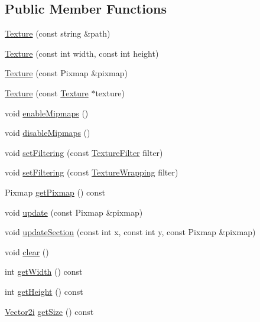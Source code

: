 \subsection*{Public Member Functions}
\begin{DoxyCompactItemize}
\item 
\hyperlink{class_texture_ab80c17c96759a05e3b3931c3ba2b4179}{Texture} (const string \&path)
\item 
\hyperlink{class_texture_a030e857c4f7c343ec37daa7f2cbab8ac}{Texture} (const int width, const int height)
\item 
\hyperlink{class_texture_ac7b9dca5c1353a30373c07c465e91390}{Texture} (const Pixmap \&pixmap)
\item 
\hyperlink{class_texture_a7a44f80c7050182de12601b457ecbe14}{Texture} (const \hyperlink{class_texture}{Texture} $\ast$texture)
\item 
void \hyperlink{class_texture_a1ffe28ecc5ac259f41aaa3a1f3147c10}{enable\+Mipmaps} ()
\item 
void \hyperlink{class_texture_aab4fc973e9c29949923caeedc784699f}{disable\+Mipmaps} ()
\item 
void \hyperlink{class_texture_a1b64d02d6168d0c51ebddb164ab02890}{set\+Filtering} (const \hyperlink{class_texture_ac4b92e6b8c820ded95490092f8bfff74}{Texture\+Filter} filter)
\item 
void \hyperlink{class_texture_ab870fe7832dd212d50eb02e4585a9cfc}{set\+Filtering} (const \hyperlink{class_texture_ab57ddfe4ab6794971da5963f80026824}{Texture\+Wrapping} filter)
\item 
Pixmap \hyperlink{class_texture_a6af7ae6c8ddad05d7c65a89809417d78}{get\+Pixmap} () const 
\item 
void \hyperlink{class_texture_aa4132473d36bbba0211f20495b6f945f}{update} (const Pixmap \&pixmap)
\item 
void \hyperlink{class_texture_a099e9e0a78063f4b6a7ddf8f57270f3e}{update\+Section} (const int x, const int y, const Pixmap \&pixmap)
\item 
void \hyperlink{class_texture_ac8bb3912a3ce86b15842e79d0b421204}{clear} ()
\item 
int \hyperlink{class_texture_af149cb053bc8b5fbc1364b5dbb934488}{get\+Width} () const 
\item 
int \hyperlink{class_texture_a317329daf960a1759801c0f16d43d5a3}{get\+Height} () const 
\item 
\hyperlink{class_vector2i}{Vector2i} \hyperlink{class_texture_add88acca2cb99db823def25c03d84ba3}{get\+Size} () const 
\end{DoxyCompactItemize}



